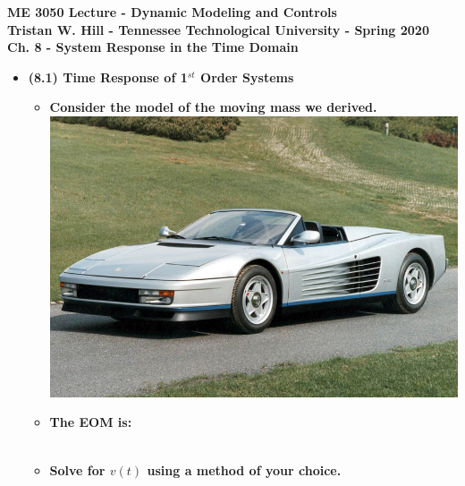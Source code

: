 \documentclass[11pt]{article}
\begin{document}
\textbf{ \LARGE ME 3050 Lecture - Dynamic Modeling and Controls} \vspace{3mm}\\
\textbf{ \hspace*{5mm}Tristan W. Hill - Tennessee Technological University - Spring 2020 } \vspace{3mm}\\


\textbf{ \LARGE Ch. 8 - System Response in the Time Domain} \\

\begin{itemize}


\item \textbf{ \LARGE (8.1) Time Response of 1$^{st}$ Order Systems} \\

\begin{itemize}


\item \textbf{ \Large Consider the model of the moving mass we derived.}\\

			\includegraphics[scale=.25]{ferrari.jpg} \\

\item \textbf{ \Large The EOM is:}\\

	 \\

\item \textbf{ \Large Solve for $v(t)$ using a method of your choice. \\\\ }\\


\end{itemize}
\end{itemize}
\end{document}
